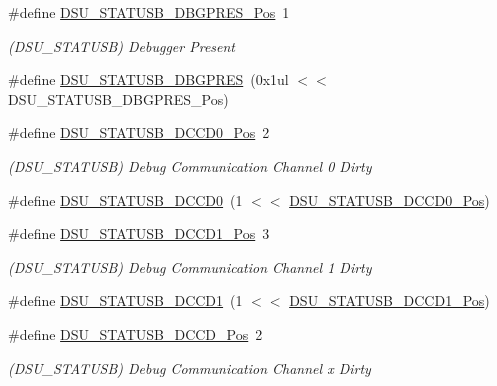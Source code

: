 \begin{DoxyCompactItemize}
\item 
\#define \mbox{\hyperlink{group___s_a_m_d21___d_s_u_ga36bd47009661963b8c71c9dc4cb62ecb}{D\+S\+U\+\_\+\+S\+T\+A\+T\+U\+S\+B\+\_\+\+D\+B\+G\+P\+R\+E\+S\+\_\+\+Pos}}~1
\begin{DoxyCompactList}\small\item\em (D\+S\+U\+\_\+\+S\+T\+A\+T\+U\+SB) Debugger Present \end{DoxyCompactList}\item 
\#define \mbox{\hyperlink{group___s_a_m_d21___d_s_u_ga9eae843ddddb99bef3d7358ccb5e8dc9}{D\+S\+U\+\_\+\+S\+T\+A\+T\+U\+S\+B\+\_\+\+D\+B\+G\+P\+R\+ES}}~(0x1ul $<$$<$ D\+S\+U\+\_\+\+S\+T\+A\+T\+U\+S\+B\+\_\+\+D\+B\+G\+P\+R\+E\+S\+\_\+\+Pos)
\item 
\#define \mbox{\hyperlink{group___s_a_m_d21___d_s_u_gadc27fc361eacd9fdd30cad6459bdc7c4}{D\+S\+U\+\_\+\+S\+T\+A\+T\+U\+S\+B\+\_\+\+D\+C\+C\+D0\+\_\+\+Pos}}~2
\begin{DoxyCompactList}\small\item\em (D\+S\+U\+\_\+\+S\+T\+A\+T\+U\+SB) Debug Communication Channel 0 Dirty \end{DoxyCompactList}\item 
\#define \mbox{\hyperlink{group___s_a_m_d21___d_s_u_gac68c39af9734e2a6e6db0dc67bf12507}{D\+S\+U\+\_\+\+S\+T\+A\+T\+U\+S\+B\+\_\+\+D\+C\+C\+D0}}~(1 $<$$<$ \mbox{\hyperlink{group___s_a_m_d21___d_s_u_gadc27fc361eacd9fdd30cad6459bdc7c4}{D\+S\+U\+\_\+\+S\+T\+A\+T\+U\+S\+B\+\_\+\+D\+C\+C\+D0\+\_\+\+Pos}})
\item 
\#define \mbox{\hyperlink{group___s_a_m_d21___d_s_u_ga43c23fdfaa496f809db2e9b7d0bea8a9}{D\+S\+U\+\_\+\+S\+T\+A\+T\+U\+S\+B\+\_\+\+D\+C\+C\+D1\+\_\+\+Pos}}~3
\begin{DoxyCompactList}\small\item\em (D\+S\+U\+\_\+\+S\+T\+A\+T\+U\+SB) Debug Communication Channel 1 Dirty \end{DoxyCompactList}\item 
\#define \mbox{\hyperlink{group___s_a_m_d21___d_s_u_gad229e036a6ca3ec924ca37250b6ea81c}{D\+S\+U\+\_\+\+S\+T\+A\+T\+U\+S\+B\+\_\+\+D\+C\+C\+D1}}~(1 $<$$<$ \mbox{\hyperlink{group___s_a_m_d21___d_s_u_ga43c23fdfaa496f809db2e9b7d0bea8a9}{D\+S\+U\+\_\+\+S\+T\+A\+T\+U\+S\+B\+\_\+\+D\+C\+C\+D1\+\_\+\+Pos}})
\item 
\#define \mbox{\hyperlink{group___s_a_m_d21___d_s_u_ga93a180646ddd3ecc99793ef1b5bde5aa}{D\+S\+U\+\_\+\+S\+T\+A\+T\+U\+S\+B\+\_\+\+D\+C\+C\+D\+\_\+\+Pos}}~2
\begin{DoxyCompactList}\small\item\em (D\+S\+U\+\_\+\+S\+T\+A\+T\+U\+SB) Debug Communication Channel x Dirty \end{DoxyCompactList}\item 
$$
\end{DoxyCompactItemize}
